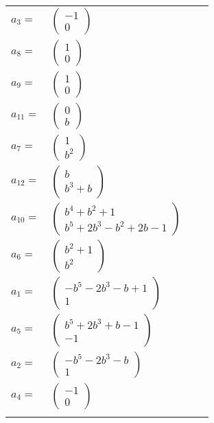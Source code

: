 \documentclass[1p]{elsarticle_modified}
\theoremstyle{definition}
\begin{document}
\begin{tabular}{m{7pt} m{180pt} m{7pt} m{180pt} }
\flushright $a_{3}=$&$\begin{pmatrix}-1\\0\end{pmatrix}$ \\
\flushright $a_{8}=$&$\begin{pmatrix}1\\0\end{pmatrix}$ \\
\flushright $a_{9}=$&$\begin{pmatrix}1\\0\end{pmatrix}$ \\
\flushright $a_{11}=$&$\begin{pmatrix}0\\b\end{pmatrix}$ \\
\flushright $a_{7}=$&$\begin{pmatrix}1\\b^2\end{pmatrix}$ \\
\flushright $a_{12}=$&$\begin{pmatrix}b\\b^3+b\end{pmatrix}$ \\
\flushright $a_{10}=$&$\begin{pmatrix}b^4+b^2+1\\b^5+2 b^3- b^2+2 b-1\end{pmatrix}$ \\
\flushright $a_{6}=$&$\begin{pmatrix}b^2+1\\b^2\end{pmatrix}$ \\
\flushright $a_{1}=$&$\begin{pmatrix}- b^5-2 b^3- b+1\\1\end{pmatrix}$ \\
\flushright $a_{5}=$&$\begin{pmatrix}b^5+2 b^3+b-1\\-1\end{pmatrix}$ \\
\flushright $a_{2}=$&$\begin{pmatrix}- b^5-2 b^3- b\\1\end{pmatrix}$ \\
\flushright $a_{4}=$&$\begin{pmatrix}-1\\0\end{pmatrix}$\\&\end{tabular}
\end{document}

